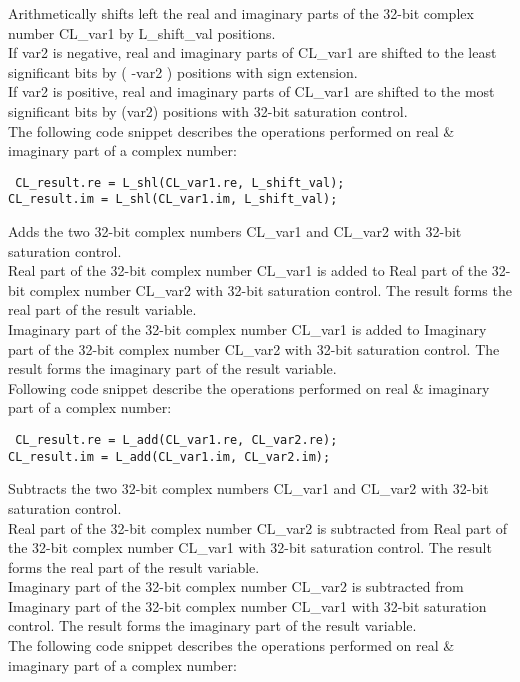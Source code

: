
Arithmetically shifts left the real and imaginary parts of the 32-bit complex number CL\_var1 by L\_shift\_val positions.\\
If var2 is negative, real and imaginary parts of CL\_var1 are shifted to the least significant bits by ( -var2 ) positions with sign extension.\\
If var2 is positive, real and imaginary parts of CL\_var1 are shifted to the most significant bits by (var2) positions with 32-bit saturation control.\\
The following code snippet describes the operations performed on real \& imaginary part of a complex number:

{\tt {} CL\_result.re = L\_shl(CL\_var1.re, L\_shift\_val);\\
 CL\_result.im = L\_shl(CL\_var1.im, L\_shift\_val);
}


Adds the two 32-bit complex numbers CL\_var1 and CL\_var2 with 32-bit saturation control.\\
Real part of the 32-bit complex number CL\_var1 is added to Real part of the 32-bit complex number CL\_var2 with 32-bit saturation control.
The result forms the real part of the result variable.\\
Imaginary part of the 32-bit complex number CL\_var1 is added to Imaginary part of the 32-bit complex number CL\_var2 with 32-bit saturation control.
The result forms the imaginary part of the result variable.\\
Following code snippet describe the operations performed on real \& imaginary part of a complex number:

{\tt {} CL\_result.re = L\_add(CL\_var1.re, CL\_var2.re);\\
 CL\_result.im = L\_add(CL\_var1.im, CL\_var2.im);
}


Subtracts the two 32-bit complex numbers CL\_var1 and CL\_var2 with 32-bit saturation control.\\
Real part of the 32-bit complex number CL\_var2 is subtracted from Real part of the 32-bit complex number CL\_var1 with 32-bit saturation control.
The result forms the real part of the result variable.\\
Imaginary part of the 32-bit complex number CL\_var2 is subtracted from Imaginary part of the 32-bit complex number CL\_var1 with 32-bit saturation control.
The result forms the imaginary part of the result variable.\\
The following code snippet describes the operations performed on real \& imaginary part of a complex number:

